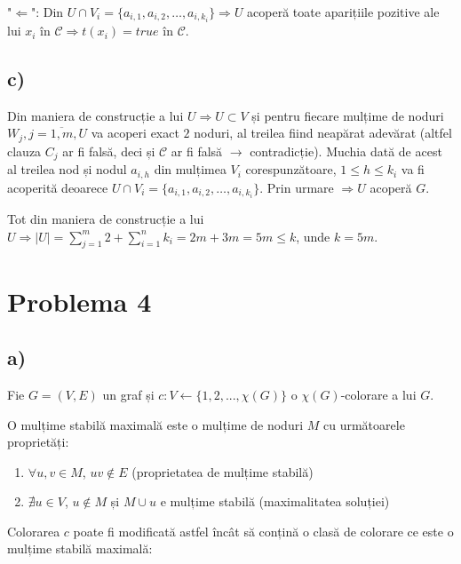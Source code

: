 \documentclass[a4paper,12pt]{article}
\begin{document}
{"$\Leftarrow$": Din $U \cap V_i = \{a_{i,1},a_{i,2},\dotsc,a_{i,k_i}\} \Rightarrow U$ acoperă toate aparițiile pozitive ale lui $x_i$ în $\mathcal{C} \Rightarrow t(x_i) = true$ în $\mathcal{C}$.

\subsection{c)}

Din maniera de construcție a lui $U \Rightarrow U \subset V$ și pentru fiecare mulțime de noduri \linebreak $W_j, j = \overline{1, m}, U$ va acoperi exact $2$ noduri, al treilea fiind neapărat adevărat (altfel clauza $C_j$ ar fi falsă, deci și $\mathcal{C}$ ar fi falsă $\rightarrow$ contradicție). Muchia dată de acest al treilea nod și nodul $a_{i,h}$ din mulțimea $V_i$ corespunzătoare, $1 \leq h \leq k_i$ va fi acoperită deoarece $U \cap V_i = \{a_{i,1},a_{i,2},\dotsc,a_{i,k_i}\}$. Prin urmare $\Rightarrow U$ acoperă $G$.

Tot din maniera de construcție a lui $U \Rightarrow |U| = \sum\limits_{j=1}^m 2 + \sum\limits_{i=1}^n k_i = 2m + 3m = 5m \leq k$, unde $k = 5m$.

\section{Problema 4}

\subsection{a)}

Fie $G = (V,E)$ un graf și $c:V \leftarrow \{1, 2, ..., \chi(G)\}$ o $\chi(G)$-colorare a lui $G$.  

O mulțime stabilă maximală este o mulțime de noduri $M$ cu următoarele proprietăți:

\begin{enumerate}
	\item $\forall u, v \in M$, $uv \notin E$ (proprietatea de mulțime stabilă)
	\item $\nexists u \in V$, $u \notin M$ și $M \cup u$ e mulțime stabilă (maximalitatea soluției)
\end{enumerate}

Colorarea $c$ poate fi modificată astfel încât să conțină o clasă de colorare ce este o mulțime stabilă maximală:

}
\end{document}
